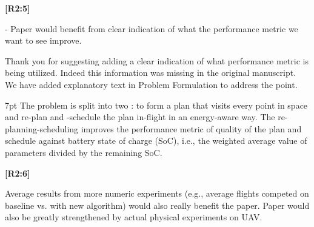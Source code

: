 \documentclass[10pt]{letter}
\newenvironment{formal}{%
  \def\FrameCommand{%
    \hspace{1pt}%
    {\color{red}\vrule width 2pt}%
    {\color{formalshade}\vrule width 4pt}%
    \colorbox{formalshade}%
  }%
  \MakeFramed{\advance\hsize-\width\FrameRestore}%
  \noindent\hspace{-4.55pt}%
  \begin{adjustwidth}{}{7pt}%
  \vspace{2pt}\vspace{2pt}%
}
{%
  \vspace{2pt}\end{adjustwidth}\endMakeFramed%
}
\begin{document}
{\hspace*{-4.5em}\textbf{[R2:5]}\vspace*{-1.9em}}

- Paper would benefit from clear indication of what the performance metric we want to see improve. 
  
{\color{blue} 
  
{\hspace*{-4.5em}{[R2:5]}\vspace*{-1.9em}}
  
Thank you for suggesting adding a clear indication of what performance metric is being utilized. Indeed this information was missing in the original manuscript. We have added explanatory text in Problem Formulation to address the point.

\begin{formal}\color{black}
The problem %
is {\color{blue}split into }%
two%
{\color{blue}: }%
to form a %
plan that visits every point in space {\color{blue}and }%
re-plan and -schedule the plan in-flight in an energy-aware way. %
{\color{blue} 
The re-planning-scheduling improves the performance metric of quality of the plan and schedule against battery state of charge (SoC), i.e., the weighted average value of parameters divided by the remaining SoC.
}
\vspace*{1ex}
\end{formal}
}

  {\hspace*{-4.5em}\textbf{[R2:6]}\vspace*{-1.9em}}

  Average results from more numeric experiments (e.g., average flights competed on baseline vs. with new algorithm) would also really benefit the paper. Paper would also be greatly strengthened by actual physical experiments on UAV.
  
\end{document}
